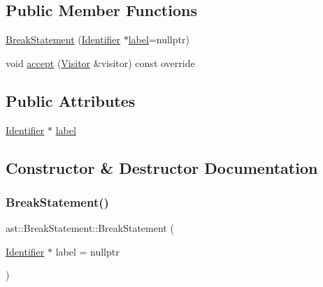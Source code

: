 \subsection*{Public Member Functions}
\begin{DoxyCompactItemize}
\item 
\hyperlink{structast_1_1_break_statement_a9b8f2fabc03702b03f0b7b61c94f5189}{Break\+Statement} (\hyperlink{structast_1_1_identifier}{Identifier} $\ast$\hyperlink{structast_1_1_break_statement_ad38ca9b59202df6aad6e4ab09fc8316d}{label}=nullptr)
\item 
void \hyperlink{structast_1_1_break_statement_ac7db635ee58478c5f917a85bd7c70b79}{accept} (\hyperlink{structast_1_1_visitor}{Visitor} \&visitor) const override
\end{DoxyCompactItemize}
\subsection*{Public Attributes}
\begin{DoxyCompactItemize}
\item 
\hyperlink{structast_1_1_identifier}{Identifier} $\ast$ \hyperlink{structast_1_1_break_statement_ad38ca9b59202df6aad6e4ab09fc8316d}{label}
\end{DoxyCompactItemize}


\subsection{Constructor \& Destructor Documentation}
\mbox{\label{structast_1_1_break_statement_a9b8f2fabc03702b03f0b7b61c94f5189}} 
\subsubsection{\texorpdfstring{Break\+Statement()}{BreakStatement()}}
{\footnotesize\ttfamily ast\+::\+Break\+Statement\+::\+Break\+Statement (\begin{DoxyParamCaption}\item[{\hyperlink{structast_1_1_identifier}{Identifier} $\ast$}]{label = {\ttfamily nullptr} }\end{DoxyParamCaption})\hspace{0.3cm}{\ttfamily [inline]}}



